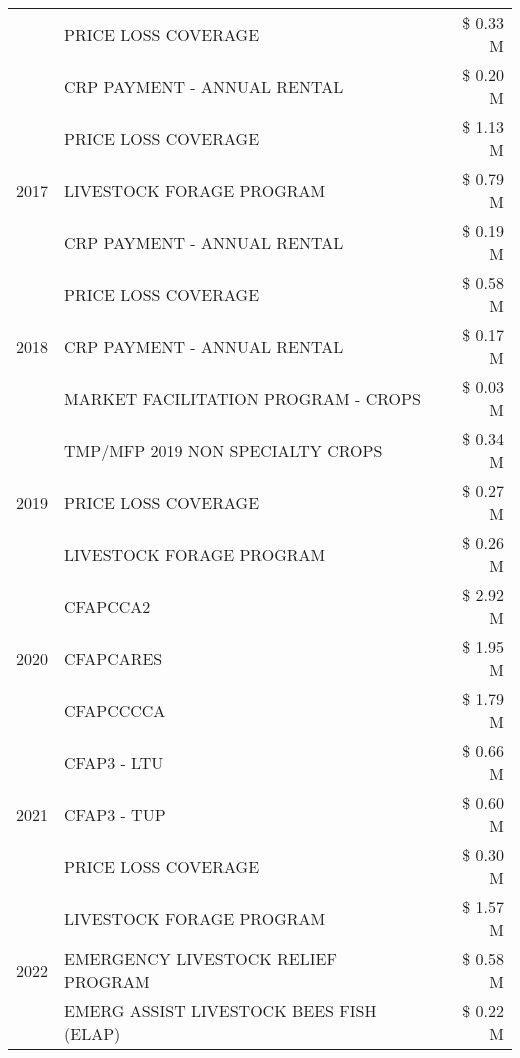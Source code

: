 \begin{tabular}{llr}
 & PRICE LOSS COVERAGE & \$ 0.33 M \\
 & CRP PAYMENT - ANNUAL RENTAL & \$ 0.20 M \\
\cline{1-3}
\multirow[t]{3}{*}{2017} & PRICE LOSS COVERAGE & \$ 1.13 M \\
 & LIVESTOCK FORAGE PROGRAM & \$ 0.79 M \\
 & CRP PAYMENT - ANNUAL RENTAL & \$ 0.19 M \\
\cline{1-3}
\multirow[t]{3}{*}{2018} & PRICE LOSS COVERAGE & \$ 0.58 M \\
 & CRP PAYMENT - ANNUAL RENTAL & \$ 0.17 M \\
 & MARKET FACILITATION PROGRAM - CROPS & \$ 0.03 M \\
\cline{1-3}
\multirow[t]{3}{*}{2019} & TMP/MFP 2019 NON SPECIALTY CROPS & \$ 0.34 M \\
 & PRICE LOSS COVERAGE & \$ 0.27 M \\
 & LIVESTOCK FORAGE PROGRAM & \$ 0.26 M \\
\cline{1-3}
\multirow[t]{3}{*}{2020} & CFAPCCA2 & \$ 2.92 M \\
 & CFAPCARES & \$ 1.95 M \\
 & CFAPCCCCA & \$ 1.79 M \\
\cline{1-3}
\multirow[t]{3}{*}{2021} & CFAP3 - LTU & \$ 0.66 M \\
 & CFAP3 - TUP & \$ 0.60 M \\
 & PRICE LOSS COVERAGE & \$ 0.30 M \\
\cline{1-3}
\multirow[t]{3}{*}{2022} & LIVESTOCK FORAGE PROGRAM & \$ 1.57 M \\
 & EMERGENCY LIVESTOCK RELIEF PROGRAM & \$ 0.58 M \\
 & EMERG ASSIST LIVESTOCK BEES FISH (ELAP) & \$ 0.22 M \\
\cline{1-3}
\bottomrule
\end{tabular}
